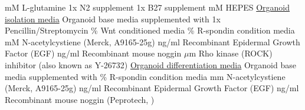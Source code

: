 \documentclass[a4paper]{report}
\begin{document}
\begin{indentlist}
 mM L-glutamine
\newline 1x N2 supplement
\newline 1x B27 supplement 
 mM HEPES
\vspace{2mm}\newline\underline{Organoid isolation media}
\vspace{2mm}\newline Organoid base media supplemented with
\newline 1x Pencillin/Streptomycin
\% Wnt conditioned media 
\% R-spondin condition media 
 mM N-acetylcystiene (Merck, A9165-25g)
 ng/ml Recombinant Epidermal Growth Factor (EGF)
 ng/ml Recombinant mouse noggin 
 $\mu$m Rho kinase (ROCK) inhibitor (also known as Y-26732) 
\vspace{2mm}\newline\underline{Organoid differentiation media}
\vspace{2mm}\newline Organoid base media supplemented with 
\% R-spondin condition media 
 mm N-acetylcystiene (Merck, A9165-25g)
 ng/ml Recombinant Epidermal Growth Factor (EGF)
 ng/ml Recombinant mouse noggin (Peprotech, ) 

\end{indentlist}
\end{document}
